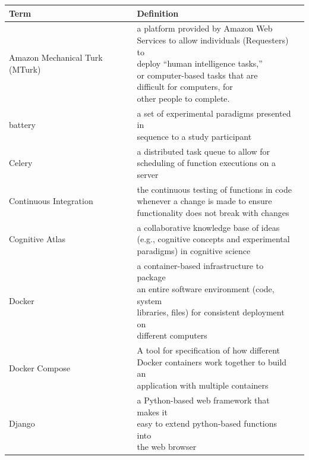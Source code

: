 \documentclass{report}
\begin{document}
\begin{table}[h!]
\centering
\begin{tabular}{ | l | l |p{5cm} |}
    \hline
    \textbf{Term} & \textbf{Definition} \\ \hline
    Amazon Mechanical Turk (MTurk) & \shortstack[l]{a platform provided by Amazon Web \\ Services to allow individuals (Requesters) to \\ deploy ``human intelligence tasks,'' \\ or computer-based tasks that are \\ difficult for computers, for \\other people to complete.} \\ \hline
    battery & \shortstack[l]{a set of experimental paradigms presented in \\ sequence to a study participant } \\ \hline
    Celery & \shortstack[l]{a distributed task queue to allow for \\ scheduling of function executions on a server} \\ \hline
    Continuous Integration & \shortstack[l]{the continuous testing of functions in code \\ whenever a change is made to ensure \\functionality does not break with changes} \\ \hline
    Cognitive Atlas & \shortstack[l]{a collaborative knowledge base of ideas \\ (e.g., cognitive concepts and experimental \\paradigms) in cognitive science} \\ \hline
    Docker & \shortstack[l]{a container-based infrastructure to package \\an entire software environment (code, system \\libraries, files) for consistent deployment on \\different computers} \\ \hline
    Docker Compose & \shortstack[l]{A tool for specification of how different\\ Docker containers work together to build an \\application with multiple containers} \\ \hline
    Django & \shortstack[l]{a Python-based web framework that makes it\\ easy to extend python-based functions into\\ the web browser } \\ \hline

\end{tabular}
\end{table}
\end{document}
